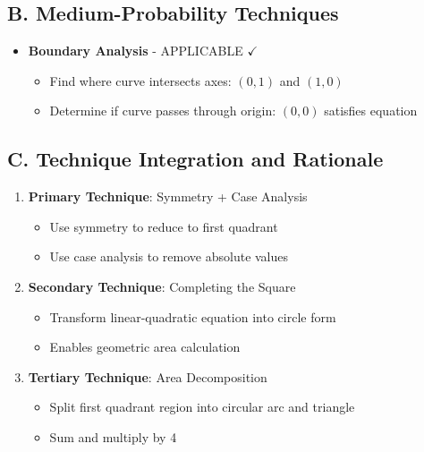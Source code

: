 \documentclass[]{article}
\begin{document}
\begin{techniquesbox}
\subsection*{B. Medium-Probability Techniques}
\begin{itemize}[leftmargin=*]
    \item \textbf{Boundary Analysis} - APPLICABLE $\checkmark$
    \begin{itemize}
        \item Find where curve intersects axes: $(0,1)$ and $(1,0)$
        \item Determine if curve passes through origin: $(0,0)$ satisfies equation
    \end{itemize}
\end{itemize}

\subsection*{C. Technique Integration and Rationale}
\begin{enumerate}[leftmargin=*]
    \item \textbf{Primary Technique}: Symmetry + Case Analysis
    \begin{itemize}
        \item Use symmetry to reduce to first quadrant
        \item Use case analysis to remove absolute values
    \end{itemize}
    
    \item \textbf{Secondary Technique}: Completing the Square
    \begin{itemize}
        \item Transform linear-quadratic equation into circle form
        \item Enables geometric area calculation
    \end{itemize}
    
    \item \textbf{Tertiary Technique}: Area Decomposition
    \begin{itemize}
        \item Split first quadrant region into circular arc and triangle
        \item Sum and multiply by 4
    \end{itemize}
\end{enumerate}


\end{techniquesbox}
\end{document}
